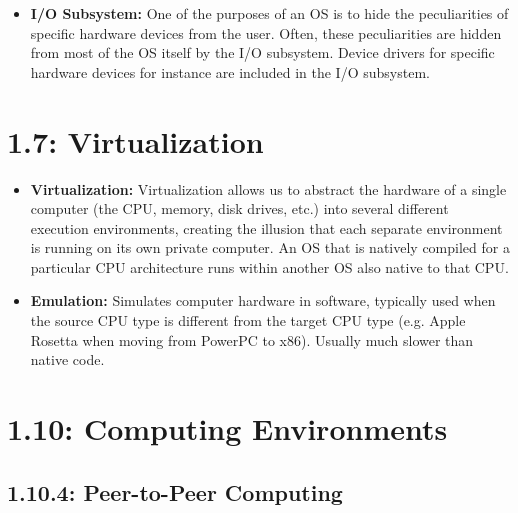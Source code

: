 \documentclass[12pt]{article}
\begin{document}
\begin{itemize}
    \item \textbf{I/O Subsystem:} One of the purposes of an OS is to hide the peculiarities of specific hardware devices from the user. Often, these peculiarities are hidden from most of the OS itself by the I/O subsystem. Device drivers for specific hardware devices for instance are included in the I/O subsystem.
\end{itemize}

\section*{1.7: Virtualization}

\begin{itemize}
    \item \textbf{Virtualization:} Virtualization allows us to abstract the hardware of a single computer (the CPU, memory, disk drives, etc.) into several different execution environments, creating the illusion that each separate environment is running on its own private computer. An OS that is natively compiled for a particular CPU architecture runs within another OS also native to that CPU.
    \item \textbf{Emulation:} Simulates computer hardware in software, typically used when the source CPU type is different from the target CPU type (e.g. Apple Rosetta when moving from PowerPC to x86). Usually much slower than native code.
\end{itemize}

\section*{1.10: Computing Environments}

\subsection*{1.10.4: Peer-to-Peer Computing}
\end{document}
